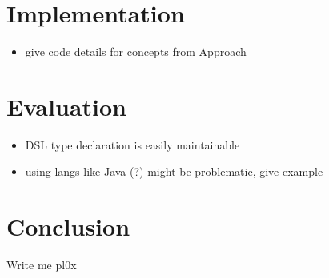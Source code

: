 \documentclass[oribibl]{llncs}
\begin{document}
\section{Implementation}
\label{sec:implementation}

\begin{itemize}
\item give code details for concepts from Approach
\end{itemize}

\section{Evaluation}
\label{sec:evaluation}

\begin{itemize}
\item DSL type declaration is easily maintainable
\item using langs like Java (?) might be problematic, give example
\end{itemize}


\section{Conclusion}
\label{sec:conclusion}
Write me pl0x

\newpage
\nocite{*}


\end{document}
